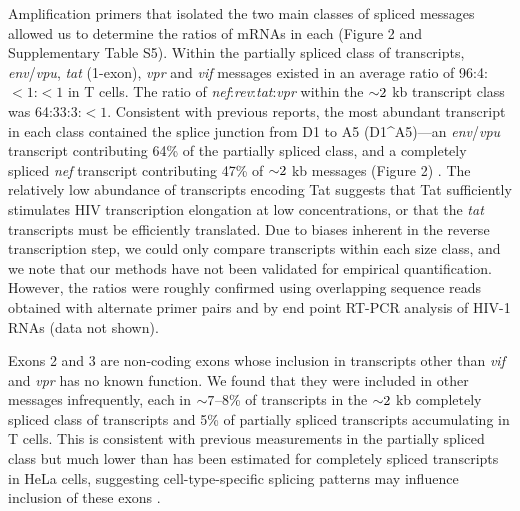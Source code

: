 \documentclass[../sherrill-Mix_thesis.tex]{subfiles}
\begin{document}
Amplification primers that isolated the two main classes of spliced messages allowed us to determine the ratios of mRNAs in each (Figure 2 and Supplementary Table S5). Within the partially spliced class of transcripts, \textit{env}/\textit{vpu}, \textit{tat} (1-exon), \textit{vpr} and \textit{vif} messages existed in an average ratio of 96:4:$<1$:$<1$ in \cdFour{} T cells. The ratio of \textit{nef}:\textit{rev}:\textit{tat}:\textit{vpr} within the $\mathord{\sim}{}2$ kb transcript class was 64:33:3:$<1$. Consistent with previous reports, the most abundant transcript in each class contained the splice junction from D1 to A5 (D1\^{}A5)---an \textit{env}/\textit{vpu} transcript contributing 64\% of the partially spliced class, and a completely spliced \textit{nef} transcript contributing 47\% of $\mathord{\sim}{}2$ kb messages (Figure 2) \citep{Purcell1993,Guatelli1990}. The relatively low abundance of transcripts encoding Tat suggests that Tat sufficiently stimulates HIV transcription elongation at low concentrations, or that the \textit{tat} transcripts must be efficiently translated. Due to biases inherent in the reverse transcription step, we could only compare transcripts within each size class, and we note that our methods have not been validated for empirical quantification. However, the ratios were roughly confirmed using overlapping sequence reads obtained with alternate primer pairs and by end point RT-PCR analysis of HIV-1 RNAs (data not shown).

Exons 2 and 3 are non-coding exons whose inclusion in transcripts other than \textit{vif} and \textit{vpr} has no known function. We found that they were included in other messages infrequently, each in $\mathord{\sim}{}7$--8\% of transcripts in the $\mathord{\sim}{}2$ kb completely spliced class of transcripts and 5\% of partially spliced transcripts accumulating in T cells. This is consistent with previous measurements in the partially spliced class but much lower than has been estimated for completely spliced transcripts in HeLa cells, suggesting cell-type-specific splicing patterns may influence inclusion of these exons \citep{Purcell1993}. 
\end{document}
